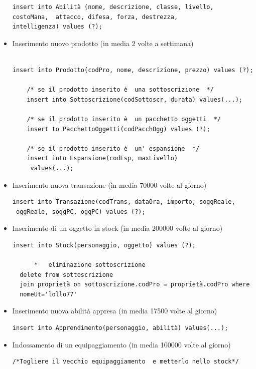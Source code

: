 \begin{itemize}
\begin{verbatim}
insert into Abilità (nome, descrizione, classe, livello,
costoMana,  attacco, difesa, forza, destrezza,
intelligenza) values (?);

\end{verbatim}
\item Inserimento nuovo prodotto (in media 2 volte a settimana)
\begin{verbatim}

insert into Prodotto(codPro, nome, descrizione, prezzo) values (?);

	/* se il prodotto inserito è  una sottoscrizione  */
	insert into Sottoscrizione(codSottoscr, durata) values(...);

	/* se il prodotto inserito è  un pacchetto oggetti  */
	insert to PacchettoOggetti(codPacchOgg) values (?);
	
	/* se il prodotto inserito è  un' espansione  */
	insert into Espansione(codEsp, maxLivello)
	 values(...);	
\end{verbatim}	

\item Inserimento nuova transazione (in media 70000 volte al giorno)

\begin{verbatim}
insert into Transazione(codTrans, dataOra, importo, soggReale,
 oggReale, soggPC, oggPC) values (?);

\end{verbatim}
\item Inserimento di un oggetto in stock (in media 200000 volte al giorno)

\begin{verbatim}
insert into Stock(personaggio, oggetto) values (?);

      *   eliminazione sottoscrizione
  delete from sottoscrizione 
  join proprietà on sottoscrizione.codPro = proprietà.codPro where
  nomeUt='lollo77'

\end{verbatim}
\item Inserimento nuova abilità appresa (in media 17500 volte al giorno)

\begin{verbatim}
insert into Apprendimento(personaggio, abilità) values(...);

\end{verbatim}
\item Indossamento di un equipaggiamento (in media 100000 volte al giorno)

\begin{verbatim}
/*Togliere il vecchio equipaggiamento  e metterlo nello stock*/


\end{verbatim}
\end{itemize}
